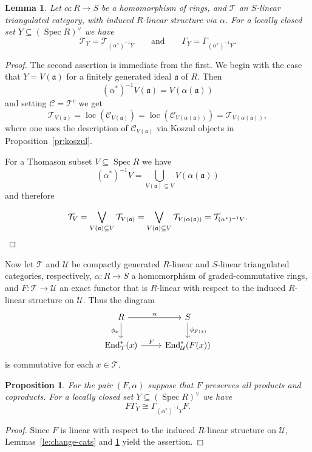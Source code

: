 \documentclass{amsart}[a4]
\newtheorem{lemma}[theorem]{Lemma}
\newtheorem{proposition}[theorem]{Proposition}
\theoremstyle{definition}
\theoremstyle{remark}
\numberwithin{equation}{section}
\newcommand{\End}{\operatorname{End}}
\newcommand{\loc}{\operatorname{loc}}
\newcommand{\Spec}{\operatorname{Spec}}
\newcommand{\cat}{\mathcal}
\newcommand{\fa}{\mathfrak{a}}
\let\Gamma\varGamma
\begin{document}
\begin{lemma}
\label{le:change-rings}
Let $\alpha\colon R\to S$ be a homomorphism of rings, and $\cat T$ an
$S$-linear triangulated category, with induced $R$-linear structure
via $\alpha$. For a locally closed set $Y\subseteq(\Spec R)^\vee$ we
have
\[\cat T_Y=\cat T_{(\alpha^*)^{-1}Y} \qquad\text{and}\qquad
\Gamma_{Y}= \Gamma_{(\alpha^*)^{-1}Y}.\]
\end{lemma}
\begin{proof}
  The second assertion is immediate from the first. We begin with the
  case that $Y=V(\fa)$ for a finitely generated ideal $\fa$ of
  $R$. Then \[(\alpha^*)^{-1}V(\fa)=V(\alpha(\fa))\] and setting 
  $\cat C=\cat T^c$ we get
  \[\cat T_{V(\fa)}=\loc(\cat C_{V(\fa)})=\loc(\cat C_{V(\alpha(\fa))})=\cat
    T_{V(\alpha(\fa))},\] where one uses the description of
  $\cat C_{V(\fa)}$ via Koszul objects in Proposition~\ref{pr:koszul}.


  For a Thomason subset $V\subseteq\Spec R$ we have
  \[(\alpha^*)^{-1}V=\bigcup_{V(\fa)\subseteq V}V(\alpha(\fa))\]
and therefore
  
  \[
    \cat T_V=\bigvee_{V(\fa)\subseteq V}\cat
    T_{V(\fa)}=\bigvee_{V(\fa)\subseteq V}\cat T_{V(\alpha(\fa))}=
\cat T_{(\alpha^*)^{-1}V}.\qedhere
  \]
\end{proof}

Now let  $\cat T$ and $\cat U$ be compactly
generated $R$-linear and $S$-linear triangulated categories,
respectively, $\alpha\colon R\to S$  a homomorphism of graded-commutative rings,
and $F\colon\cat T\to\cat U$  an exact functor that is $R$-linear with respect to the
induced $R$-linear structure on $\cat U$. Thus the
diagram
\[
  \begin{tikzcd}
    R\ar[d,swap,"\phi_x"]\ar[r,"\alpha"]&S\ar[d,"\phi_{F(x)}"]\\
    \End^*_{\cat T}(x)\ar[r,"F"]&   \End^*_{\cat U}(F(x))
  \end{tikzcd}
\]
is commutative for each $x\in \cat T$.

\begin{proposition}
  \label{pr:change-cats-rings}
  For the pair $(F,\alpha)$ suppose that $F$ preserves all products
  and coproducts.  For a locally closed set $Y\subseteq(\Spec R)^\vee$
  we have
\[F\Gamma_{Y}\cong \Gamma_{(\alpha^*)^{-1}Y}F.\]
\end{proposition}
\begin{proof}
Since $F$ is linear with respect to the induced $R$-linear structure
on $\cat U$, Lemmas~\ref{le:change-cats} and
\ref{le:change-rings} yield the assertion.
\end{proof}
\end{document}

